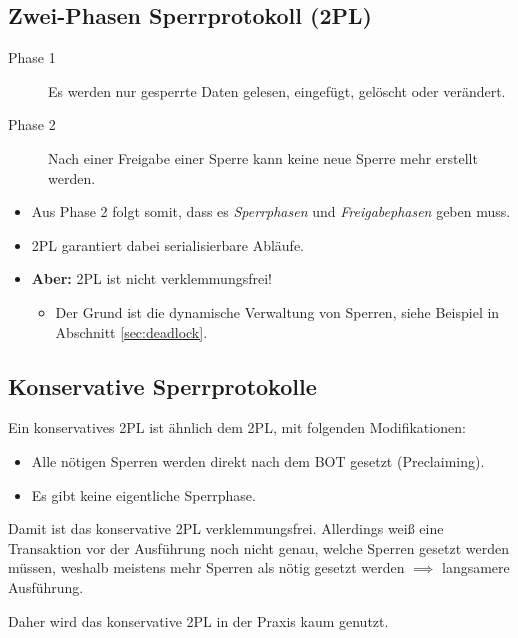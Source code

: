 		\subsection{Zwei-Phasen Sperrprotokoll (2PL)} %
			\begin{description}
				\item[Phase 1] Es werden nur gesperrte Daten gelesen, eingefügt, gelöscht oder verändert.
				\item[Phase 2] Nach einer Freigabe einer Sperre kann keine neue Sperre mehr erstellt werden.
			\end{description}
			\begin{itemize}
				\item Aus Phase 2 folgt somit, dass es \textit{Sperrphasen} und \textit{Freigabephasen} geben muss.
				\item 2PL garantiert dabei serialisierbare Abläufe.
				\item \textbf{Aber:} 2PL ist nicht verklemmungsfrei!
					\begin{itemize}
						\item Der Grund ist die dynamische Verwaltung von Sperren, siehe Beispiel in Abschnitt \ref{sec:deadlock}.
					\end{itemize}
			\end{itemize}

		\subsection{Konservative Sperrprotokolle} %
			Ein konservatives 2PL ist ähnlich dem 2PL, mit folgenden Modifikationen:
			\begin{itemize}
				\item Alle nötigen Sperren werden direkt nach dem BOT gesetzt (Preclaiming).
				\item Es gibt keine eigentliche Sperrphase.
			\end{itemize}

			Damit ist das konservative 2PL verklemmungsfrei. Allerdings weiß eine Transaktion vor der Ausführung noch nicht genau, welche Sperren gesetzt werden müssen, weshalb meistens mehr Sperren als nötig gesetzt werden \( \implies \) langsamere Ausführung.

			Daher wird das konservative 2PL in der Praxis kaum genutzt.


